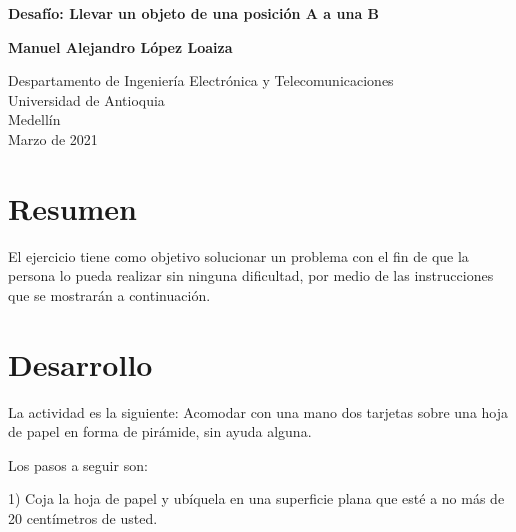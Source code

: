 \documentclass{article}
\begin{document}
\begin{titlepage}
    \begin{center}
        \vspace*{1cm}
            
        \Huge
        \textbf{Desafío: Llevar un objeto de una posición A a una B}
            
        \vspace{0.5cm}
        \LARGE
        
            
        \vspace{1.5cm}
            
        \textbf{Manuel Alejandro López Loaiza}
            
        \vfill
            
        \vspace{0.8cm}
            
        \Large
        Despartamento de Ingeniería Electrónica y Telecomunicaciones\\
        Universidad de Antioquia\\
        Medellín\\
        Marzo de 2021
            
    \end{center}
\end{titlepage}

\tableofcontents

\newpage
\section{Resumen}\label{intro}

El ejercicio tiene como objetivo solucionar un problema con el fin de que la persona lo pueda realizar sin ninguna dificultad, por medio de las instrucciones que se  mostrarán a continuación.

\section{Desarrollo} \label{contenido}

La actividad es la siguiente: Acomodar con una mano dos tarjetas sobre una hoja de papel en forma de pirámide, sin  ayuda alguna.
\vspace{10PT}

Los pasos a seguir son:

\vspace{10PT}

1) Coja la hoja de papel y ubíquela en una superficie plana que esté a no más de 20 centímetros de usted.
\end{document}
